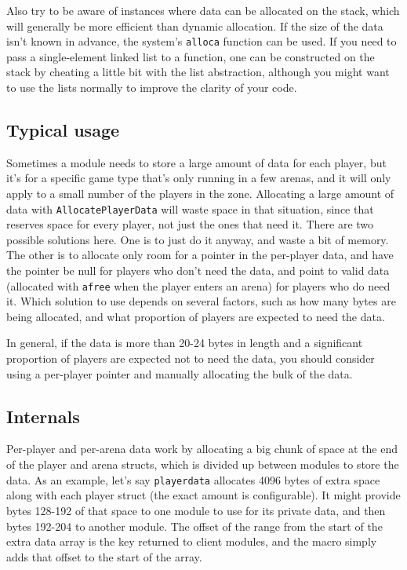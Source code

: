 \documentclass{article}
\begin{document}
Also try to be aware of instances where data can be allocated on the
stack, which will generally be more efficient than dynamic allocation.
If the size of the data isn't known in advance, the system's
\verb/alloca/ function can be used. If you need to pass a single-element
linked list to a function, one can be constructed on the stack by
cheating a little bit with the list abstraction, although you might want
to use the lists normally to improve the clarity of your code.


\subsection{Typical usage}

Sometimes a module needs to store a large amount of data for each
player, but it's for a specific game type that's only running in a few
arenas, and it will only apply to a small number of the players in the
zone. Allocating a large amount of data with \verb/AllocatePlayerData/
will waste space in that situation, since that reserves space for every
player, not just the ones that need it. There are two possible solutions
here. One is to just do it anyway, and waste a bit of memory. The other
is to allocate only room for a pointer in the per-player data, and have
the pointer be null for players who don't need the data, and point to
valid data (allocated with \verb/afree/ when the player enters an arena)
for players who do need it. Which solution to use depends on several
factors, such as how many bytes are being allocated, and what proportion
of players are expected to need the data.

In general, if the data is more than 20-24 bytes in length and a
significant proportion of players are expected not to need the data, you
should consider using a per-player pointer and manually allocating the
bulk of the data.


\subsection{Internals}

Per-player and per-arena data work by allocating a big chunk of space at
the end of the player and arena structs, which is divided up between
modules to store the data. As an example, let's say \verb/playerdata/
allocates 4096 bytes of extra space along with each player struct (the
exact amount is configurable). It might provide bytes 128-192 of that
space to one module to use for its private data, and then bytes 192-204
to another module. The offset of the range from the start of the extra
data array is the key returned to client modules, and the macro simply
adds that offset to the start of the array.
\end{document}
